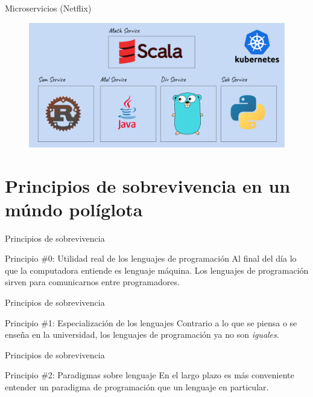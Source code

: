 \documentclass[aspectratio=169]{beamer}
\begin{document}
\begin{frame}{Microservicios (Netflix)}

	\begin{figure}
		\centering
		\includegraphics[width=\linewidth]{Images/microservices}
	\end{figure}

\end{frame}




\section{Principios de sobrevivencia en un múndo políglota}

\begin{frame}{Principios de sobrevivencia}

	\begin{exampleblock}{Principio \#0: Utilidad real de los lenguajes de programación}
    Al final del día lo que la computadora entiende es lenguaje máquina. Los lenguajes de programación sirven para comunicarnos entre programadores.
	\end{exampleblock}
\end{frame}


\begin{frame}{Principios de sobrevivencia}

	\begin{exampleblock}{Principio \#1: Especialización de los lenguajes}
    Contrario a lo que se piensa o se enseña en la universidad, los lenguajes de programación ya no son \textit{iguales}.
	\end{exampleblock}
\end{frame}


\begin{frame}{Principios de sobrevivencia}

	\begin{exampleblock}{Principio \#2: Paradigmas sobre lenguaje}
    En el largo plazo es más conveniente entender un paradigma de programación que un lenguaje en particular.
	\end{exampleblock}
\end{frame}
\end{document}
